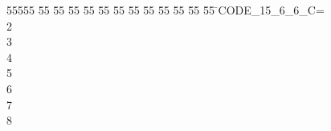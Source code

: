 %
%
\begin{tabbing}
55555 \= 55 \= 55 \= 55 \= 55 \= 55 \= 55 \= 55 \= 55 \= 55 \= 55 \= 55 \= 55 \= \>CODE\_15\_6\_6\_C=\\[0pt]
2\ \\[0pt]
3\ \\[0pt]
4\ \\[0pt]
5\ \\[0pt]
6\ \\[0pt]
7\\[0pt]
8\>\end{tabbing}
